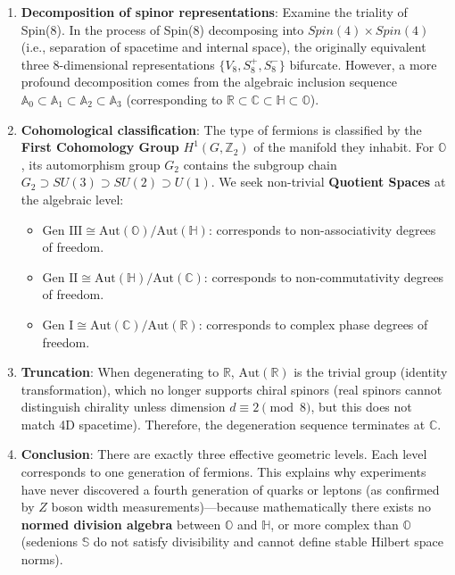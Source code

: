 \begin{enumerate}
\item \textbf{Decomposition of spinor representations}:
   Examine the triality of Spin(8). In the process of Spin(8) decomposing into $Spin(4) \times Spin(4)$ (i.e., separation of spacetime and internal space), the originally equivalent three 8-dimensional representations $\{V_8, S_8^+, S_8^-\}$ bifurcate.
   However, a more profound decomposition comes from the algebraic inclusion sequence $\mathbb{A}_0 \subset \mathbb{A}_1 \subset \mathbb{A}_2 \subset \mathbb{A}_3$ (corresponding to $\mathbb{R} \subset \mathbb{C} \subset \mathbb{H} \subset \mathbb{O}$).

\item \textbf{Cohomological classification}:
   The type of fermions is classified by the \textbf{First Cohomology Group} $H^1(G, \mathbb{Z}_2)$ of the manifold they inhabit.
   For $\mathbb{O}$, its automorphism group $G_2$ contains the subgroup chain $G_2 \supset SU(3) \supset SU(2) \supset U(1)$.
   We seek non-trivial \textbf{Quotient Spaces} at the algebraic level:
   \begin{itemize}
   \item $\text{Gen III} \cong \text{Aut}(\mathbb{O}) / \text{Aut}(\mathbb{H})$: corresponds to non-associativity degrees of freedom.
   \item $\text{Gen II} \cong \text{Aut}(\mathbb{H}) / \text{Aut}(\mathbb{C})$: corresponds to non-commutativity degrees of freedom.
   \item $\text{Gen I} \cong \text{Aut}(\mathbb{C}) / \text{Aut}(\mathbb{R})$: corresponds to complex phase degrees of freedom.
   \end{itemize}

\item \textbf{Truncation}:
   When degenerating to $\mathbb{R}$, $\text{Aut}(\mathbb{R})$ is the trivial group (identity transformation), which no longer supports chiral spinors (real spinors cannot distinguish chirality unless dimension $d \equiv 2 \pmod 8$, but this does not match 4D spacetime). Therefore, the degeneration sequence terminates at $\mathbb{C}$.

\item \textbf{Conclusion}:
   There are exactly three effective geometric levels. Each level corresponds to one generation of fermions. This explains why experiments have never discovered a fourth generation of quarks or leptons (as confirmed by $Z$ boson width measurements)---because mathematically there exists no \textbf{normed division algebra} between $\mathbb{O}$ and $\mathbb{H}$, or more complex than $\mathbb{O}$ (sedenions $\mathbb{S}$ do not satisfy divisibility and cannot define stable Hilbert space norms).
\end{enumerate}

